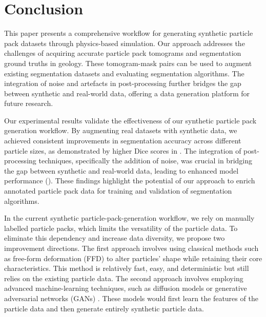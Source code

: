 \documentclass[preprint,12pt]{elsarticle}
\begin{document}
\section{Conclusion}
This paper presents a comprehensive workflow for generating synthetic particle pack datasets through physics-based simulation. 
Our approach addresses the challenges of acquiring accurate particle pack tomograms and segmentation ground truths in geology. 
These tomogram-mask pairs can be used to augment existing segmentation datasets and evaluating segmentation algorithms. 
The integration of noise and artefacts in post-processing further bridges the gap between synthetic and real-world data, offering a data generation platform for future research. 
\par
Our experimental results validate the effectiveness of our synthetic particle pack generation workflow. 
By augmenting real datasets with synthetic data, we achieved consistent improvements in segmentation accuracy across different particle sizes, as demonstrated by higher Dice scores in . 
The integration of post-processing techniques, specifically the addition of noise, was crucial in bridging the gap between synthetic and real-world data, leading to enhanced model performance (). 
These findings highlight the potential of our approach to enrich annotated particle pack data for training and validation of segmentation algorithms.
\par
In the current synthetic particle-pack-generation workflow, we rely on manually labelled particle packs, which limits the versatility of the particle data. 
To eliminate this dependency and increase data diversity, we propose two improvement directions. 
The first approach involves using classical methods such as free-form deformation (FFD) \cite{sederberg1986free} to alter particles' shape while retaining their core characteristics. 
This method is relatively fast, easy, and deterministic but still relies on the existing particle data.
The second approach involves employing advanced machine-learning techniques, such as diffusion models \cite{ho2020denoising} or generative adversarial networks (GANs) \cite{goodfellow2014generativea}. 
These models would first learn the features of the particle data and then generate entirely synthetic particle data. 


\end{document}
